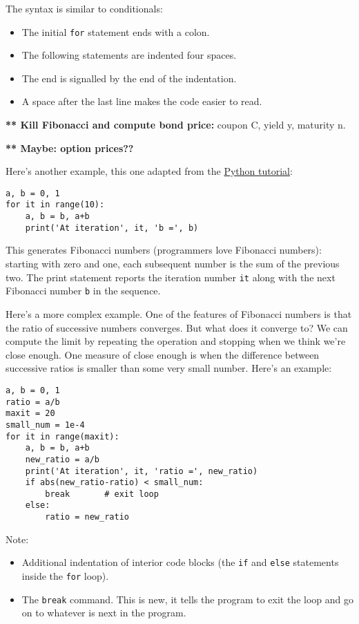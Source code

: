 \documentclass[11pt]{article}
\begin{document}
\begin{itemize}
The syntax is similar to conditionals:
\begin{itemize}
\item The initial {\tt for} statement ends with a colon.
\item The following statements are indented four spaces.
\item The end is signalled by the end of the indentation.
\item A space after the last line makes the code easier to read.
\end{itemize}


{\bf *** Kill Fibonacci and compute bond price:}
coupon C, yield y, maturity n.  

{\bf *** Maybe:  option prices??} 

Here's another example, this one adapted from the
\href{https://docs.python.org/3/tutorial/introduction.html#first-steps-towards-programming}{Python tutorial}:
%
\begin{verbatim}
a, b = 0, 1
for it in range(10):
    a, b = b, a+b
    print('At iteration', it, 'b =', b)
\end{verbatim}
This generates Fibonacci numbers
(programmers love Fibonacci numbers):
starting with zero and one, each subsequent number is the sum of the previous two.
The print statement reports the iteration number {\tt it} along with the next Fibonacci number {\tt b}
in the sequence.


Here's a more complex example.
One of the features of Fibonacci numbers is that the ratio of
successive numbers converges.
But what does it converge to?
We can compute the limit by repeating the operation and
stopping when we think we're close enough.
One measure of close enough is when the difference
between successive ratios is smaller than some very small number.
Here's an example:
\begin{verbatim}
a, b = 0, 1
ratio = a/b
maxit = 20
small_num = 1e-4
for it in range(maxit):
    a, b = b, a+b
    new_ratio = a/b
    print('At iteration', it, 'ratio =', new_ratio)
    if abs(new_ratio-ratio) < small_num:
        break       # exit loop
    else:
        ratio = new_ratio
\end{verbatim}
Note:
\begin{itemize}
\item Additional indentation of interior code blocks
(the {\tt if} and {\tt else} statements inside the {\tt for} loop).
\item The {\tt break} command.
This is new, it tells the program to exit the loop and go on to whatever
is next in the program.
\end{itemize}


\end{itemize}
\end{document}
